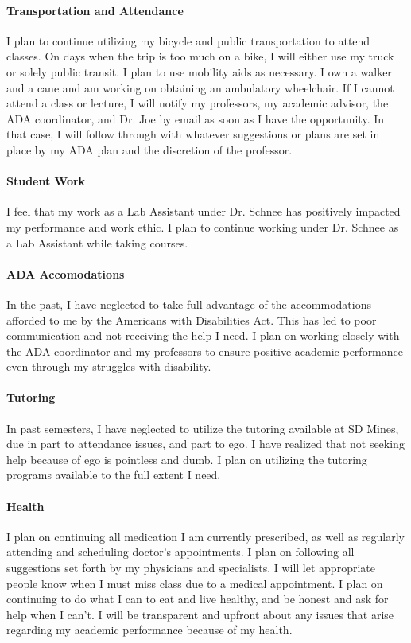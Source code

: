\documentclass[12pt]{article}
\begin{document}
\paragraph{Transportation and Attendance}
I plan to continue utilizing my bicycle and public transportation to attend classes.
On days when the trip is too much on a bike, 
I will either use my truck or solely public transit.
I plan to use mobility aids as necessary.
I own a walker and a cane and am working on obtaining an ambulatory wheelchair.
If I cannot attend a class or lecture, I will notify 
my professors, my academic advisor, the ADA coordinator, and Dr. Joe by email as
soon as I have the opportunity.
In that case, I will follow through with whatever suggestions or plans are set 
in place by my ADA plan and the discretion of the professor.

\paragraph{Student Work}
I feel that my work as a Lab Assistant under Dr. Schnee has positively impacted 
my performance and work ethic.
I plan to continue working under Dr. Schnee as a Lab Assistant while taking courses.

\paragraph{ADA Accomodations}
In the past, I have neglected to take full advantage of the accommodations afforded to me 
by the Americans with Disabilities Act.
This has led to poor communication and not receiving the help I need.
I plan on working closely with the ADA coordinator and my professors to ensure
positive academic performance even through my struggles with disability.

\paragraph{Tutoring}
In past semesters, I have neglected to utilize the tutoring available at SD Mines, 
due in part to attendance issues, and part to ego.
I have realized that not seeking help because of ego is pointless and dumb.
I plan on utilizing the tutoring programs available to the full extent I need.

\paragraph{Health}
I plan on continuing all medication I am currently prescribed, as well as 
regularly attending and scheduling doctor's appointments.
I plan on following all suggestions set forth by my physicians and specialists.
I will let appropriate people know when I must miss class due to a medical appointment.
I plan on continuing to do what I can to eat and live healthy, and be honest and 
ask for help when I can't.
I will be transparent and upfront about any issues that arise regarding my academic performance 
because of my health.
\end{document}
